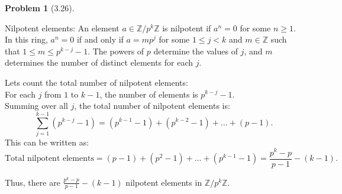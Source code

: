 \documentclass[12pt]{article}
\theoremstyle{definition}
\newtheorem{problem}{Problem}
\begin{document}
\begin{problem}[3.26]
\begin{enumerate}[label=(\alph*)]
        \begin{solution}
            Nilpotent elements: An element $a \in \mathbb{Z}/p^k\mathbb{Z}$ is nilpotent if $a^n = 0$ for some $n \geq 1$. In this ring, $a^n = 0$ if and only if $a = mp^j$ for some $1 \leq j < k$ and $m \in \mathbb{Z}$ such that $1 \leq m \leq p^{k-j} - 1$. The powers of $p$ determine the values of $j$, and $m$ determines the number of distinct elements for each $j$.
            
            Lets count the total number of nilpotent elements:\\
            For each $j$ from $1$ to $k-1$, the number of elements is $p^{k-j} - 1$.\\
            Summing over all $j$, the total number of nilpotent elements is:
            \[
            \sum_{j=1}^{k-1} (p^{k-j} - 1) = (p^{k-1} - 1) + (p^{k-2} - 1) + \dots + (p - 1).
            \]
            This can be written as:
            \[
            \text{Total nilpotent elements} = (p - 1) + (p^2 - 1) + \dots + (p^{k-1} - 1) = \frac{p^k - p}{p-1} - (k - 1).
            \]
            
            Thus, there are $\frac{p^k - p}{p-1} - (k - 1)$ nilpotent elements in $\mathbb{Z}/p^k\mathbb{Z}$.            
        \end{solution}
    \end{enumerate}
\end{problem}
\end{document}
